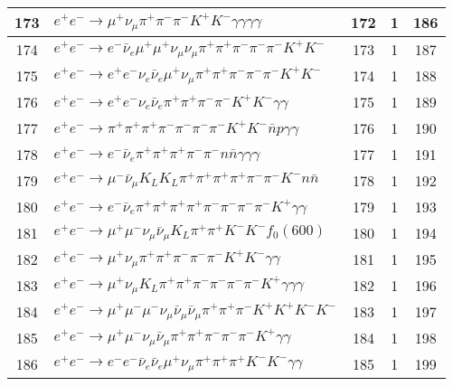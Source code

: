 \documentclass[landscape]{article}
\begin{document}
\begin{table}[htbp!]
\begin{tabular}{|c|>{\centering}p{18cm}|c|c|c|}
\hline
173 & $ e^{+} e^{-} \rightarrow \mu^{+} \nu_{\mu} \pi^{+} \pi^{-} \pi^{-} K^{+} K^{-} \gamma \gamma \gamma \gamma $ & 172 & 1 & 186 \\
\hline
174 & $ e^{+} e^{-} \rightarrow e^{-} \bar{\nu}_{e} \mu^{+} \mu^{+} \nu_{\mu} \nu_{\mu} \pi^{+} \pi^{+} \pi^{-} \pi^{-} \pi^{-} K^{+} K^{-} $ & 173 & 1 & 187 \\
\hline
175 & $ e^{+} e^{-} \rightarrow e^{+} e^{-} \nu_{e} \bar{\nu}_{e} \mu^{+} \nu_{\mu} \pi^{+} \pi^{+} \pi^{-} \pi^{-} \pi^{-} K^{+} K^{-} $ & 174 & 1 & 188 \\
\hline
176 & $ e^{+} e^{-} \rightarrow e^{+} e^{-} \nu_{e} \bar{\nu}_{e} \pi^{+} \pi^{+} \pi^{-} \pi^{-} K^{+} K^{-} \gamma \gamma $ & 175 & 1 & 189 \\
\hline
177 & $ e^{+} e^{-} \rightarrow \pi^{+} \pi^{+} \pi^{+} \pi^{-} \pi^{-} \pi^{-} \pi^{-} K^{+} K^{-} \bar{n} p \gamma \gamma $ & 176 & 1 & 190 \\
\hline
178 & $ e^{+} e^{-} \rightarrow e^{-} \bar{\nu}_{e} \pi^{+} \pi^{+} \pi^{+} \pi^{-} \pi^{-} n \bar{n} \gamma \gamma \gamma $ & 177 & 1 & 191 \\
\hline
179 & $ e^{+} e^{-} \rightarrow \mu^{-} \bar{\nu}_{\mu} K_{L} K_{L} \pi^{+} \pi^{+} \pi^{+} \pi^{+} \pi^{-} \pi^{-} K^{-} n \bar{n} $ & 178 & 1 & 192 \\
\hline
180 & $ e^{+} e^{-} \rightarrow e^{-} \bar{\nu}_{e} \pi^{+} \pi^{+} \pi^{+} \pi^{+} \pi^{-} \pi^{-} \pi^{-} \pi^{-} K^{+} \gamma \gamma $ & 179 & 1 & 193 \\
\hline
181 & $ e^{+} e^{-} \rightarrow \mu^{+} \mu^{-} \nu_{\mu} \bar{\nu}_{\mu} K_{L} \pi^{+} \pi^{+} K^{-} K^{-} f_{0}(600) $ & 180 & 1 & 194 \\
\hline
182 & $ e^{+} e^{-} \rightarrow \mu^{+} \nu_{\mu} \pi^{+} \pi^{+} \pi^{-} \pi^{-} \pi^{-} K^{+} K^{-} \gamma \gamma $ & 181 & 1 & 195 \\
\hline
183 & $ e^{+} e^{-} \rightarrow \mu^{+} \nu_{\mu} K_{L} \pi^{+} \pi^{+} \pi^{-} \pi^{-} \pi^{-} \pi^{-} K^{+} \gamma \gamma \gamma $ & 182 & 1 & 196 \\
\hline
184 & $ e^{+} e^{-} \rightarrow \mu^{+} \mu^{-} \mu^{-} \nu_{\mu} \bar{\nu}_{\mu} \bar{\nu}_{\mu} \pi^{+} \pi^{+} \pi^{-} K^{+} K^{+} K^{-} K^{-} $ & 183 & 1 & 197 \\
\hline
185 & $ e^{+} e^{-} \rightarrow \mu^{+} \mu^{-} \nu_{\mu} \bar{\nu}_{\mu} \pi^{+} \pi^{+} \pi^{-} \pi^{-} \pi^{-} K^{+} \gamma \gamma $ & 184 & 1 & 198 \\
\hline
186 & $ e^{+} e^{-} \rightarrow e^{-} e^{-} \bar{\nu}_{e} \bar{\nu}_{e} \mu^{+} \nu_{\mu} \pi^{+} \pi^{+} \pi^{+} K^{-} K^{-} \gamma \gamma $ & 185 & 1 & 199 \\

\end{tabular}
\end{table}
\end{document}
